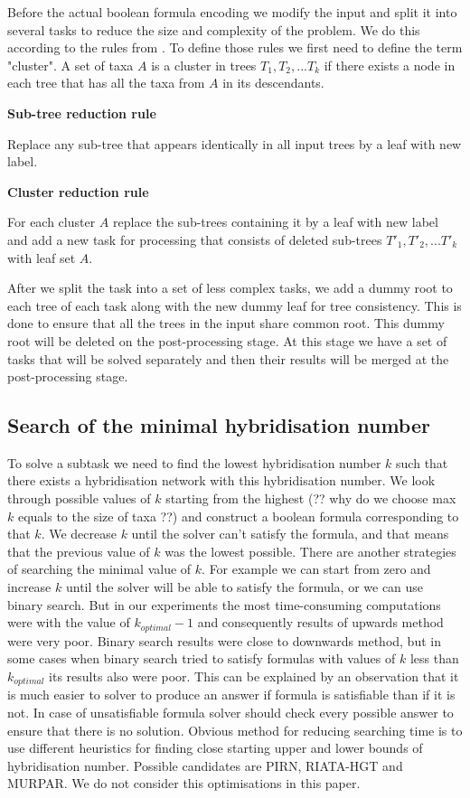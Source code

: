 \documentclass[runningheads, envcountsame, a4paper]{llncs}
\begin{document}
Before the actual boolean formula encoding we modify the input and split it into several tasks to reduce the size 
and complexity of the problem. We do this according to the rules from \cite {bonet2009efficiently}. To define those 
rules we first need to define the term "cluster". A set of taxa $A$ is a cluster in trees $T_1, T_2, ... T_k$ if there 
exists a node in each tree that has all the taxa from $A$ in its descendants.

\textbf{Sub-tree reduction rule}

Replace any sub-tree that appears identically in all input trees by a leaf with new label.

\textbf{Cluster reduction rule}

For each cluster $A$ replace the sub-trees containing it by a leaf with new label and add a new task for processing 
that consists of deleted sub-trees $T'_1, T'_2, ... T'_k$ with leaf set $A$.

After we split the task into a set of less complex tasks, we add a dummy root to each tree of each task along with 
the new dummy leaf for tree consistency. This is done to ensure that all the trees in the input share common root. 
This dummy root will be deleted on the post-processing stage. At this stage we have a set of tasks that will be solved 
separately and then their results will be merged at the post-processing stage.

\subsection{Search of the minimal hybridisation number}

To solve a subtask we need to find the lowest hybridisation number $k$ such that there exists a hybridisation 
network with this hybridisation number. We look through possible values of $k$ starting from the highest (?? why do 
we choose max $k$ equals to the size of taxa ??) and construct a boolean formula corresponding to that $k$. 
We decrease $k$ until the solver can't satisfy the formula, and that means that the previous value of $k$ was the 
lowest possible. There are another strategies of searching the minimal value of $k$. For example we can start from 
zero and increase $k$ until the solver will be able to satisfy the formula, or we can use binary search. But in our 
experiments the most time-consuming computations were with the value of $k_{optimal} - 1$ and consequently results of 
upwards method were very poor. Binary search results were close to downwards method, but in some cases when binary search 
tried to satisfy formulas with values of $k$ less than $k_{optimal}$ its results also were poor. This can be explained by 
an observation that it is much easier to solver to produce an answer if formula is satisfiable than if it is not. In case 
of unsatisfiable formula solver should check every possible answer to ensure that there is no solution. Obvious method 
for reducing searching time is to use different heuristics for finding close starting upper and lower bounds of 
hybridisation number. Possible candidates are PIRN, RIATA-HGT and MURPAR. We do not consider this optimisations in this paper.
\end{document}
